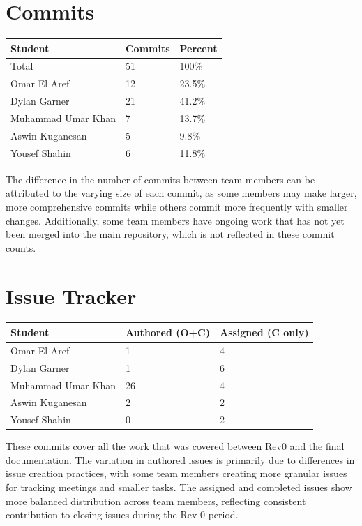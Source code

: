 \documentclass{article}
\begin{document}
\section{Commits}

\begin{table}[H]
\centering
\begin{tabular}{lll}
\toprule
\textbf{Student} & \textbf{Commits} & \textbf{Percent}\\
\midrule
Total & 51 & 100\% \\
Omar El Aref & 12 & 23.5\% \\
Dylan Garner & 21 & 41.2\% \\
Muhammad Umar Khan & 7 & 13.7\% \\
Aswin Kuganesan & 5 & 9.8\% \\
Yousef Shahin & 6 & 11.8\% \\
\bottomrule
\end{tabular}
\end{table}

The difference in the number of commits between team members can be attributed to the varying size of each commit, as some members may make larger, more comprehensive commits while others commit more frequently with smaller changes. Additionally, some team members have ongoing work that has not yet been merged into the main repository, which is not reflected in these commit counts.

\section{Issue Tracker}

\begin{table}[H]
\centering
\begin{tabular}{lll}
\toprule
\textbf{Student} & \textbf{Authored (O+C)} & \textbf{Assigned (C only)}\\
\midrule
Omar El Aref & 1 & 4 \\
Dylan Garner & 1 & 6 \\
Muhammad Umar Khan & 26 & 4 \\
Aswin Kuganesan & 2 & 2 \\
Yousef Shahin & 0 & 2 \\
\bottomrule
\end{tabular}
\end{table}

These commits cover all the work that was covered between Rev0 and the final documentation. The variation in authored issues is primarily due to differences in issue creation practices, with some team members creating more granular issues for tracking meetings and smaller tasks. The assigned and completed issues show more balanced distribution across team members, reflecting consistent contribution to closing issues during the Rev 0 period.
\end{document}
